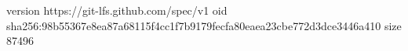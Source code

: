 version https://git-lfs.github.com/spec/v1
oid sha256:98b55367e8ea87a68115f4cc1f7b9179fecfa80eaea23cbe772d3dce3446a410
size 87496

